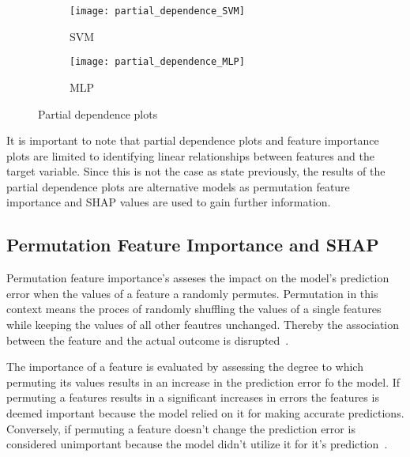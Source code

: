 \begin{figure}
    \begin{tcolorbox}[arc=0pt,boxrule=0.5pt]
        \centering
        \begin{subfigure}{0.45\textwidth}
            \texttt{[image: partial\_dependence\_SVM]}
            \caption{SVM}
            \label{fig:feature_impoartances_rf}
        \end{subfigure}
        \hfill
        \begin{subfigure}{0.45\textwidth}
            \texttt{[image: partial\_dependence\_MLP]}
            \caption{MLP}
            \label{fig:partial_dependence_svm}
        \end{subfigure}
        \hfill
        \caption{Partial dependence plots}

        \label{fig:partial_dependence_plots}
    \end{tcolorbox}
\end{figure}

It is important to note that partial dependence plots and feature importance plots are limited to
identifying linear relationships between features and the target variable.
Since this is not the case as state previously, the results of the partial dependence plots are
alternative models as permutation feature importance and SHAP values are used to gain further
information.

\subsection{Permutation Feature Importance and SHAP}\label{subsec:permutation-feature-importance-
and-shap}

Permutation feature importance's asseses the impact on the model's prediction error when the values
of a feature a randomly permutes. Permutation in this context means the proces of randomly
shuffling the values of a single features while keeping the values of all other feautres unchanged.
Thereby the association between the feature and the actual outcome is disrupted~\cite[p. 157]{
    molnar2020interpretable}.

The importance of a feature is evaluated by assessing the degree to which permuting its values
results in an increase in the prediction error fo the model.
If permuting a features results in a significant increases in errors the features is deemed
important because the model relied on it for making accurate predictions.
Conversely, if permuting a feature doesn't change the prediction error is considered unimportant
because the model didn't utilize it for it's prediction~\cite[p. 158]{molnar2020interpretable}.

